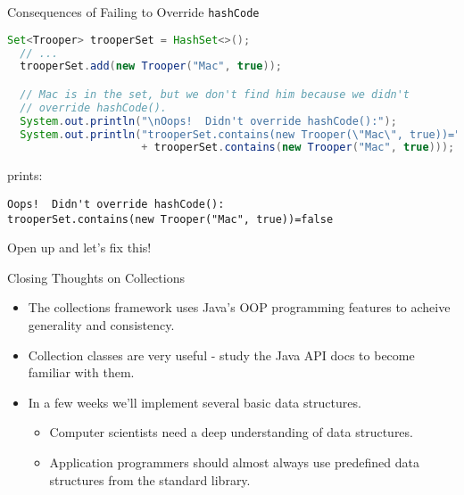 \documentclass{beamer}
\begin{document}
\begin{frame}[fragile]{Consequences of Failing to Override {\tt hashCode}}

\begin{lstlisting}[language=Java]
  Set<Trooper> trooperSet = HashSet<>();
  // ...
  trooperSet.add(new Trooper("Mac", true));

  // Mac is in the set, but we don't find him because we didn't
  // override hashCode().
  System.out.println("\nOops!  Didn't override hashCode():");
  System.out.println("trooperSet.contains(new Trooper(\"Mac\", true))="
                     + trooperSet.contains(new Trooper("Mac", true)));

\end{lstlisting}
prints:
\begin{verbatim}
Oops!  Didn't override hashCode():
trooperSet.contains(new Trooper("Mac", true))=false
\end{verbatim}

Open up  and let's fix this!

\end{frame}

\begin{frame}[fragile]{Closing Thoughts on Collections}


\begin{itemize}
\item The collections framework uses Java's OOP programming features to acheive generality and consistency.
\item Collection classes are very useful - study the Java API docs to become familiar with them.
\item In a few weeks we'll implement several basic data structures.
\begin{itemize}
\item Computer scientists need a deep understanding of data structures.
\item Application programmers should almost always use predefined data structures from the standard library.
\end{itemize}
\end{itemize}


\end{frame}








\end{document}
